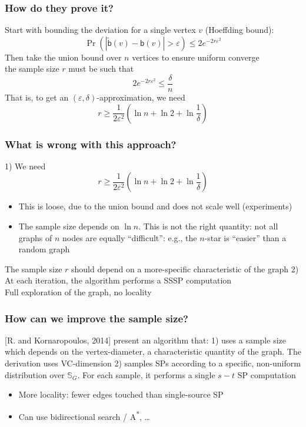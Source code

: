 \documentclass[aspectratio=169]{beamer}
\newcommand*{\betw}{\ensuremath{\mathsf{b}}\xspace}
\begin{document}
\begin{frame}
  \frametitle{How do they prove it?}
  Start with bounding the deviation for a single vertex $v$ (Hoeffding bound):
  \[
    \Pr(|\tilde{\betw}(v)-\betw(v)|>\varepsilon)\le 2e^{-2r\varepsilon^2}
  \]
  \vfill
  Then take the union bound over $n$ vertices to ensure uniform converge\\
  \quad the sample size $r$ must be such that
  \[
    2e^{-2r\varepsilon^2}\le\frac{\delta}{n}
  \]
  That is, to get an $(\varepsilon,\delta)$-approximation, we need
  \[
    r\ge\frac{1}{2\varepsilon^2}\left(\ln n + \ln 2 +
    \ln\frac{1}{\delta}\right)
  \]
\end{frame}

\begin{frame}
  \frametitle{What is wrong with this approach?}
  1) We need
  \[
    r\ge\frac{1}{2\varepsilon^2}\left(\ln n + \ln 2 +
    \ln\frac{1}{\delta}\right)
  \]
  \begin{itemize}
    \item This is loose, due to the union bound and does not scale well (experiments)
    \item The sample size depends on $\ln n$. This is not the right
      quantity: not all graphs of $n$ nodes are equally ``difficult'': e.g., the $n$-star is ``easier'' than a random graph
  \end{itemize}
  The sample size $r$ should depend on a more-specific characteristic of the graph
  \vfill
  2) At each iteration, the algorithm performs a SSSP computation\\
  \quad Full exploration of the graph, no locality
\end{frame}

\begin{frame}
  \frametitle{How can we improve the sample size?}
  [R. and Kornaropoulos, 2014] present an algorithm that:
  \vfill
  1) uses a sample size which depends on the vertex-diameter, a characteristic
  quantity of the graph. The derivation uses VC-dimension
  \vfill
  2) samples SPs according to a specific, non-uniform distribution over
  $\mathbb{S}_G$. For each sample, it performs a single $s-t$ SP computation
    \begin{itemize}
      \item More locality: fewer edges touched than single-source SP
      \item Can use bidirectional search / A\textsuperscript{*},
        \ldots
      \end{itemize}
\end{frame}
\end{document}
